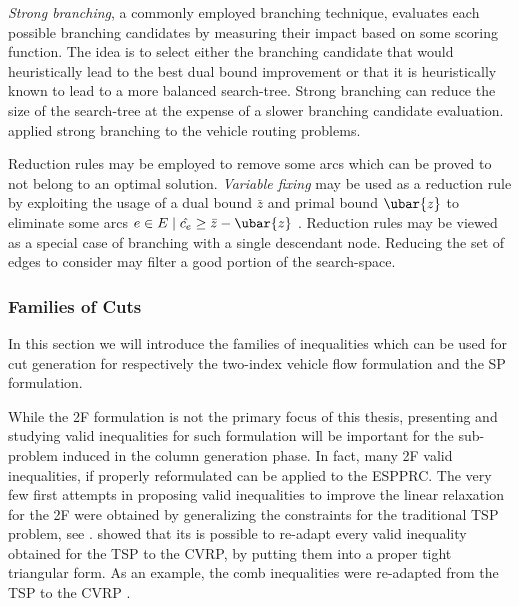 \textit{Strong branching}, a commonly employed branching technique,
evaluates each possible branching candidates
by measuring their impact based on some scoring function.
The idea is to select either the branching candidate that
would heuristically lead to the best dual bound improvement
or that it is heuristically known to lead to a more balanced search-tree.
Strong branching can reduce the size of the search-tree
at the expense of a slower branching candidate evaluation.
\textcite{fukasawa2006, pecin2017a, pecin2017b} applied strong branching
to the vehicle routing problems.

\medskip

Reduction rules may be employed to remove some arcs
which can be proved to not belong to an optimal solution.
\textit{Variable fixing} may be used as a reduction rule by exploiting
the usage of a dual bound $\bar{z}$ and primal bound $\ubar{z}$ to eliminate some
arcs $e \in E \mid \hat{c_e} \ge \bar{z} - \ubar{z}$ \parencite{hadjar2006, irnich2010}.
Reduction rules may be viewed as a special case of branching
with a single descendant node.
Reducing the set of edges to consider may filter a good portion of the search-space.



\subsubsection{Families of Cuts}
\label{sec:families-of-cuts}

In this section we will introduce the families of inequalities
which can be used for cut generation for respectively
the two-index vehicle flow formulation
and the SP formulation.


While the 2F formulation is not the primary focus of this thesis,
presenting and studying valid inequalities for such formulation
will be important for the sub-problem induced in the column generation phase.
In fact, many 2F valid inequalities, if properly reformulated
can be applied to the ESPPRC.
The very few first attempts in proposing valid inequalities
to improve the linear relaxation for the 2F were obtained by
generalizing the constraints for the traditional TSP problem, see \textcite{naddef1993}.
\citeauthor{naddef1993} showed that its is possible to re-adapt
every valid inequality obtained for the TSP to the CVRP,
by putting them into a proper tight triangular form.
As an example,
the comb inequalities were re-adapted from the TSP to the CVRP \parencite{chvatal1973,grotschel1979,augerat1995a}.

